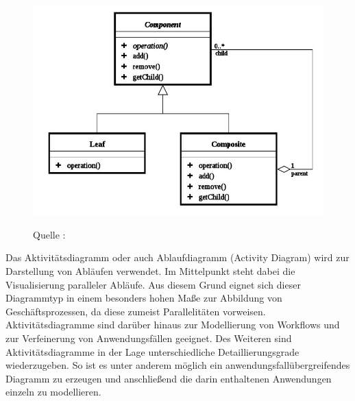 \begin{center}
\begin{figure}[h]
   
\includegraphics[scale=0.7]{Graphics/Klassendiagram.jpg} 



Quelle : \cite{MT005}

\label{fig3}


\end{figure}
\end{center}
\newpage
Das Aktivitätsdiagramm oder auch Ablaufdiagramm (Activity Diagram) wird zur Darstellung von Abläufen verwendet. Im Mittelpunkt steht dabei die Visualisierung paralleler Abläufe. Aus diesem Grund eignet sich dieser Diagrammtyp in einem besonders hohen Maße zur Abbildung von Geschäftsprozessen, da diese zumeist Parallelitäten vorweisen. Aktivitätsdiagramme sind darüber hinaus zur Modellierung von Workflows und zur Verfeinerung von Anwendungsfällen geeignet. Des Weiteren sind Aktivitätsdiagramme in der Lage unterschiedliche Detaillierungsgrade wiederzugeben. So ist es unter anderem möglich ein anwendungsfallübergreifendes Diagramm zu erzeugen und anschließend die darin enthaltenen Anwendungen einzeln zu modellieren.\\ \\

